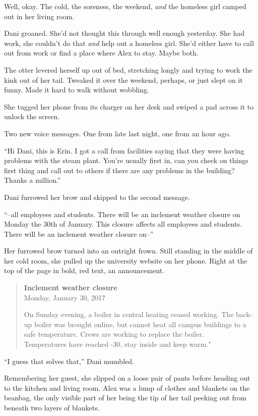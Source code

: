 Well, okay. The cold, the soreness, the weekend, \emph{and} the homeless girl camped out in her living room.

Dani groaned. She'd not thought this through well enough yesterday. She had work, she couldn't do that \emph{and} help out a homeless girl. She'd either have to call out from work or find a place where Alex to stay. Maybe both.

The otter levered herself up out of bed, stretching longly and trying to work the kink out of her tail. Tweaked it over the weekend, perhaps, or just slept on it funny. Made it hard to walk without wobbling.

She tugged her phone from its charger on her desk and swiped a pad across it to unlock the screen.

Two new voice messages. One from late last night, one from an hour ago.

``Hi Dani, this is Erin. I got a call from facilities saying that they were having problems with the steam plant. You're usually first in, can you check on things first thing and call out to others if there are any problems in the building? Thanks a million.''

Dani furrowed her brow and skipped to the second message.

``--all employees and students. There will be an inclement weather closure on Monday the 30th of January. This closure affects all employees and students. There will be an inclement weather closure on--''

Her furrowed brow turned into an outright frown. Still standing in the middle of her cold room, she pulled up the university website on her phone. Right at the top of the page in bold, red text, an announcement.

\begin{quote}
\textbf{Inclement weather closure}\\
Monday, January 30, 2017

On Sunday evening, a boiler in central heating ceased working. The back-up boiler was brought online, but cannot heat all campus buildings to a safe temperature. Crews are working to replace the boiler.\\
Temperatures have reached -30, stay inside and keep warm."
\end{quote}

``I guess that solves that,'' Dani mumbled.

Remembering her guest, she slipped on a loose pair of pants before heading out to the kitchen and living room. Alex was a lump of clothes and blankets on the beanbag, the only visible part of her being the tip of her tail peeking out from beneath two layers of blankets.

